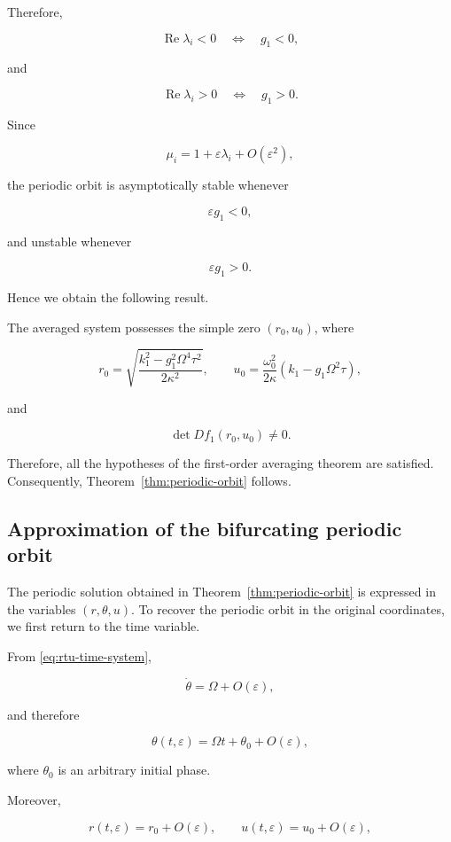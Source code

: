 \documentclass[11pt,reqno]{amsart}
\theoremstyle{plain}
\theoremstyle{definition}
\theoremstyle{remark}
\begin{document}
Therefore,

\[
\operatorname{Re}\lambda_i<0
\quad\Longleftrightarrow\quad
g_1<0,
\]

and

\[
\operatorname{Re}\lambda_i>0
\quad\Longleftrightarrow\quad
g_1>0.
\]

Since

\[
\mu_i
=
1+\varepsilon\lambda_i+O(\varepsilon^2),
\]

the periodic orbit is asymptotically stable whenever

\[
\varepsilon g_1<0,
\]

and unstable whenever

\[
\varepsilon g_1>0.
\]

Hence we obtain the following result.

The averaged system possesses the simple zero
$(r_0,u_0)$, where

\[
r_0=
\sqrt{\frac{k_1^2-g_1^2\Omega^4\tau^2}{2\kappa^2}},
\qquad
u_0=
\frac{\omega_0^2}{2\kappa}
(k_1-g_1\Omega^2\tau),
\]

and

\[
\det Df_1(r_0,u_0)\neq0.
\]

Therefore, all the hypotheses of the first-order averaging theorem are
satisfied. Consequently, Theorem~\ref{thm:periodic-orbit} follows.
\subsection{Approximation of the bifurcating periodic orbit}

The periodic solution obtained in Theorem~\ref{thm:periodic-orbit} is
expressed in the variables $(r,\theta,u)$.
To recover the periodic orbit in the original coordinates, we first
return to the time variable.

From \eqref{eq:rtu-time-system},

\[
\dot\theta
=
\Omega
+
O(\varepsilon),
\]

and therefore

\begin{equation}
\label{eq:theta-time}
\boxed{
\theta(t,\varepsilon)
=
\Omega t+\theta_0+O(\varepsilon),
}
\end{equation}

where $\theta_0$ is an arbitrary initial phase.

Moreover,

\[
r(t,\varepsilon)
=
r_0+O(\varepsilon),
\qquad
u(t,\varepsilon)
=
u_0+O(\varepsilon),
\]
\end{document}
